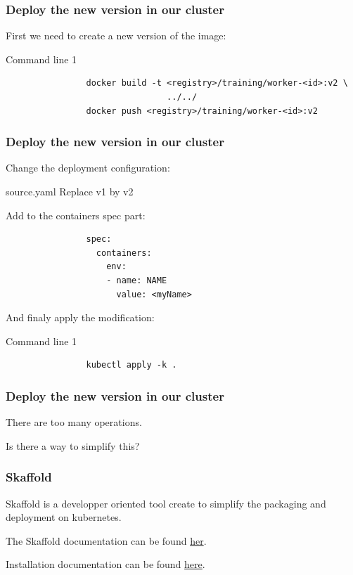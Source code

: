 	\begin{frame}[fragile]
		\frametitle{Deploy the new version in our cluster}
		
		First we need to create a new version of the image:
		\begin{block}{Command line 1}
			\begin{verbatim}
				docker build -t <registry>/training/worker-<id>:v2 \
				                ../../
				docker push <registry>/training/worker-<id>:v2
			\end{verbatim}
		\end{block}
	\end{frame}
	
	\begin{frame}[fragile]
		\frametitle{Deploy the new version in our cluster}
		
		Change the deployment configuration:
		\begin{block}{source.yaml}
			Replace v1 by v2
			
			Add to the containers spec part:
			\begin{verbatim}
				spec:
				  containers:
				    env:
				    - name: NAME
				      value: <myName>
			\end{verbatim}
		\end{block}
		
		And finaly apply the modification:
		\begin{block}{Command line 1}
			\begin{verbatim}
				kubectl apply -k .
			\end{verbatim}
		\end{block}
	\end{frame}
	
	\begin{frame}
		\frametitle{Deploy the new version in our cluster}
		
		There are too many operations.
		
		\bigskip
		Is there a way to simplify this?
	\end{frame}
	
	\begin{frame}
		\frametitle{Skaffold}
		
		Skaffold is a developper oriented tool create to simplify the packaging and deployment on kubernetes.
		
		\medskip
		The Skaffold documentation can be found \href{https://github.com/GoogleContainerTools/skaffold}{her}.
		
		\medskip
		Installation documentation can be found \href{https://skaffold.dev/docs/getting-started}{here}.
	\end{frame}
	
